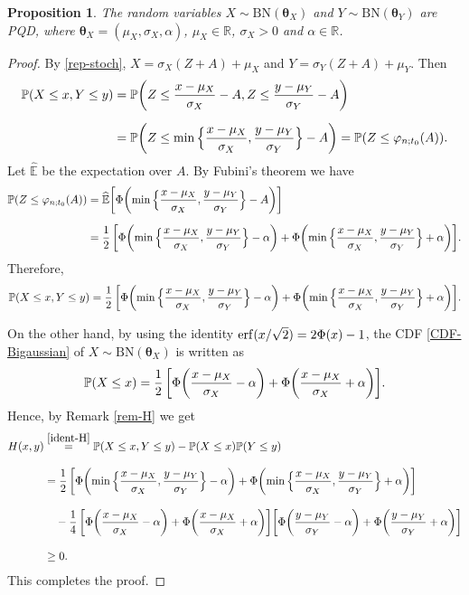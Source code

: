 \documentclass[12pt]{article}
\newtheorem{proposition}[theorem]{Proposition}
\theoremstyle{definition}
\begin{document}
\begin{proposition}\label{Prop-pqd}
The random variables $X\sim \text{BN}(\boldsymbol{\theta}_X)$ and $Y\sim \text{BN}(\boldsymbol{\theta}_Y)$ are PQD, where
 $\boldsymbol{\theta}_X=(\mu_X,\sigma_X,\alpha)$, $\mu_X\in\mathbb{R}$, $\sigma_X>0$ and $\alpha\in \mathbb{R}$.
\end{proposition}
\begin{proof}
By \eqref{rep-stoch}, $X=\sigma_X(Z+A)+\mu_X$ and $Y=\sigma_Y(Z+A)+\mu_Y$.
Then
\begin{align*}
\mathbb{P}(X\leq x,Y\leq y)
&=
\mathbb{P}\biggl(Z\leq {x-\mu_X\over\sigma_X}-A ,Z\leq {y-\mu_Y\over\sigma_Y}-A\biggr)
\\[0,2cm]
&=
\mathbb{P}\biggl(Z\leq \min\Big\{{x-\mu_X\over\sigma_X},{y-\mu_Y\over\sigma_Y}\Big\}-A\biggr)
=
\mathbb{P}(Z\leq \varphi_{n;t_0}(A)).
\end{align*}
Let $\widehat{\mathbb{E}}$ be the expectation over $A$. By Fubini’s theorem we have
\begin{align*}
\mathbb{P}(Z\leq \varphi_{n;t_0}(A))
&=
\widehat{\mathbb{E}}\biggl[\Phi\biggl(\min\Big\{{x-\mu_X\over\sigma_X},{y-\mu_Y\over\sigma_Y}\Big\}-A\biggr)\biggr]
\\[0,2cm]
&=
{1\over 2}\, \biggl[
\Phi\biggl(\min\Big\{{x-\mu_X\over\sigma_X},{y-\mu_Y\over\sigma_Y}\Big\}-\alpha\biggr)
+
\Phi\biggl(\min\Big\{{x-\mu_X\over\sigma_X},{y-\mu_Y\over\sigma_Y}\Big\}+\alpha\biggr)
\biggr].
\end{align*}
Therefore,
\begin{align*}
\mathbb{P}(X\leq x,Y\leq y)
=
{1\over 2}\, \biggl[
\Phi\biggl(\min\Big\{{x-\mu_X\over\sigma_X},{y-\mu_Y\over\sigma_Y}\Big\}-\alpha\biggr)
+
\Phi\biggl(\min\Big\{{x-\mu_X\over\sigma_X},{y-\mu_Y\over\sigma_Y}\Big\}+\alpha\biggr)
\biggr].
\end{align*}

On the other hand, by using the identity 
${\rm erf}({x/\sqrt{2}})=2\Phi(x)-1$, the CDF \eqref{CDF-Bigaussian} of $X\sim \text{BN}(\boldsymbol{\theta}_X)$ is written as
\begin{align*}
\mathbb{P}(X\leq x)
=
{1\over 2}\, \biggl[
\Phi\biggl({x-\mu_X\over\sigma_X}-\alpha\biggr)
+
\Phi\biggl({x-\mu_X\over\sigma_X}+\alpha\biggr)
\biggr].
\end{align*}
Hence, by Remark \ref{rem-H} we get
\begin{align*}
H(x,y)
&\stackrel{\eqref{ident-H}}{=}
\mathbb{P}(X\leq x,Y\leq y)-\mathbb{P}(X\leq x)\mathbb{P}(Y\leq y)
\\[0,3cm]
&=
{1\over 2}\, \biggl[
\Phi\biggl(\min\Big\{{x-\mu_X\over\sigma_X},{y-\mu_Y\over\sigma_Y}\Big\}-\alpha\biggr)
+
\Phi\biggl(\min\Big\{{x-\mu_X\over\sigma_X},{y-\mu_Y\over\sigma_Y}\Big\}+\alpha\biggr)
\biggr]
\\[0,3cm]
&\quad -
{1\over 4}\, \biggl[
\Phi\biggl({x-\mu_X\over\sigma_X}-\alpha\biggr)
+
\Phi\biggl({x-\mu_X\over\sigma_X}+\alpha\biggr)
\biggr]
\biggl[
\Phi\biggl({y-\mu_Y\over\sigma_Y}-\alpha\biggr)
+
\Phi\biggl({y-\mu_Y\over\sigma_Y}+\alpha\biggr)
\biggr]
\\[0,3cm]
&
\geq 0.
\end{align*}
This completes the proof.
\end{proof}
\end{document}
